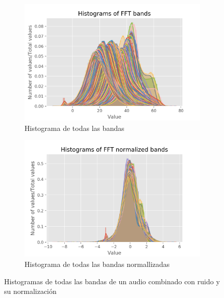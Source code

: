 \begin{figure}[t!]
	\centering
	\begin{subfigure}[t]{0.5\textwidth}
		\centering
		\includegraphics[width=\textwidth]{figures/bands_hist}
		\caption{Histograma de todas las bandas}
		\label{fig: bands_hist}
	\end{subfigure}%
	\hspace*{10pt}
	\begin{subfigure}[t]{0.5\textwidth}
		\centering
		\includegraphics[width=\textwidth]{figures/bands_norm_hist}
		\caption{Histograma de todas las bandas normallizadas}
		\label{fig: bands_norm_hist}
	\end{subfigure}
	\caption{Histogramas de todas las bandas de un audio combinado con ruido y su normalización}
\end{figure}
